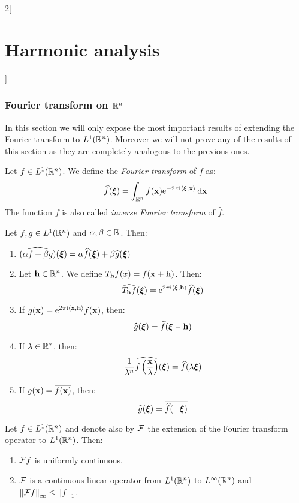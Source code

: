 \documentclass[../../../main_math.tex]{subfiles}
\begin{document}
\begin{multicols}{2}[\section{Harmonic analysis}]
  \subsubsection{Fourier transform on \texorpdfstring{$\mathbb{R}^n$}{Rn}}
  In this section we will only expose the most important results of extending the Fourier transform to $L^1(\mathbb{R}^n)$. Moreover we will not prove any of the results of this section as they are completely analogous to the previous ones.
  \begin{definition}
    Let $f\in L^1(\mathbb{R}^n)$. We define the \emph{Fourier transform} of $f$ as:
    $$\widehat{f}(\boldsymbol{\mathrm{\xi}})=\int_{\mathbb{R}^n}f(\boldsymbol{\mathrm{x}})\mathrm{e}^{-2\pi \mathrm{i}\langle \boldsymbol{\mathrm{\xi}}, \boldsymbol{\mathrm{x}}\rangle}\dd{\boldsymbol{\mathrm{x}}}$$
    The function $f$ is also called \emph{inverse Fourier transform} of $\widehat{f}$.
  \end{definition}
  \begin{proposition}\label{HA:fourierPropertiesRn}
    Let $f,g\in L^1(\mathbb{R}^n)$ and $\alpha,\beta\in\mathbb{R}$. Then:
    \begin{enumerate}
      \item $\widehat{(\alpha f+\beta g)}(\boldsymbol{\mathrm{\xi}})=\alpha\widehat{f}(\boldsymbol{\mathrm{\xi}})+\beta \widehat{g}(\boldsymbol{\mathrm{\xi}})$
      \item Let $\boldsymbol{\mathrm{h}}\in\mathbb{R}^n$. We define $T_{\boldsymbol{\mathrm{h}}}f(x)=f(\boldsymbol{\mathrm{x}}+\boldsymbol{\mathrm{h}})$. Then: $$\widehat{T_{\boldsymbol{\mathrm{h}}}f}(\boldsymbol{\mathrm{\xi}})=\mathrm{e}^{2\pi\mathrm{i} \langle\boldsymbol{\mathrm{\xi}}, \boldsymbol{\mathrm{h}}\rangle}\widehat{f}(\boldsymbol{\mathrm{\xi}})$$
      \item If $g(\boldsymbol{\mathrm{x}})=\mathrm{e}^{2\pi\mathrm{i} \langle\boldsymbol{\mathrm{x}}, \boldsymbol{\mathrm{h}}\rangle}f(\boldsymbol{\mathrm{x}})$, then: $$\widehat{g}(\boldsymbol{\mathrm{\xi}})=\widehat{f}(\boldsymbol{\mathrm{\xi}}-\boldsymbol{\mathrm{h}})$$
      \item If $\lambda\in\mathbb{R}^*$, then: $$\frac{1}{\lambda^n}\widehat{f\left(\frac{\boldsymbol{\mathrm{x}}}{\lambda}\right)}(\boldsymbol{\mathrm{\xi}})=\widehat{f}(\lambda\boldsymbol{\mathrm{\xi}})$$
      \item If $g(\boldsymbol{\mathrm{x}})=\overline{f(\boldsymbol{\mathrm{x}})}$, then: $$\widehat{g}(\boldsymbol{\mathrm{\xi}})=\overline{\widehat{f}(-\boldsymbol{\mathrm{\xi}})}$$
    \end{enumerate}
  \end{proposition}
  \begin{theorem}
    Let $f\in L^1(\mathbb{R}^n)$ and denote also by $\mathcal{F}$ the extension of the Fourier transform operator to $L^1(\mathbb{R}^n)$. Then:
    \begin{enumerate}
      \item $\mathcal{F} f$ is uniformly continuous.
      \item $\mathcal{F}$ is a continuous linear operator from $L^1(\mathbb{R}^n)$ to $L^\infty(\mathbb{R}^n)$ and $\left\|\mathcal{F} f\right\|_{\infty}\leq \left\|f\right\|_1$.
    \end{enumerate}

\end{theorem}
\end{multicols}
\end{document}

